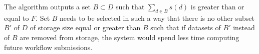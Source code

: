 The algorithm outputs a set $B \subset D$ such that $\sum_{d \in B}{s(d)}$ is greater than or equal to $F$.  Set $B$ needs to be selected in such a way that there is no other subset $B'$ of $D$ of storage size equal or greater than $B$ such that if datasets of $B'$ instead of $B$ are removed from storage, the system would spend less time computing future workflow submissions. 